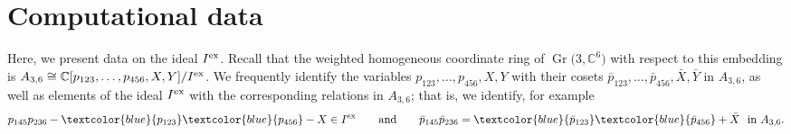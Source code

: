 \documentclass[10pt,a4paper]{amsart}
\numberwithin{equation}{section}
\DeclareMathOperator{\Gr}{Gr}
\begin{document}
\section{Computational data}\label{sec:data Gr36}
Here, we present data on the ideal $I^{\rm ex}$.
Recall that the weighted homogeneous coordinate ring of $\Gr\big(3,\mathbb C^6\big)$ with respect to this embedding is $A_{3,6}\cong \mathbb C[p_{123},\dots,p_{456},X,Y]/I^{\rm ex}$.
We frequently identify the variables $p_{123},\dots,p_{456},X,Y$ with their cosets $\bar p_{123},\dots,\bar p_{456},\bar X,\bar Y$ in $A_{3,6}$, as well as elements of the ideal $I^{\rm ex}$ with the corresponding relations in $A_{3,6}$; that is, we identify, for example
\begin{displaymath}
p_{145}p_{236} - \textcolor{blue}{p_{123}}\textcolor{blue}{p_{456}} - X \in I^{\rm ex} \qquad \text{and} \qquad \bar p_{145}\bar p_{236} = \textcolor{blue}{\bar p_{123}}\textcolor{blue}{\bar p_{456}} + \bar X \ \text{ in } A_{3,6}.
\end{displaymath}
\end{document}
